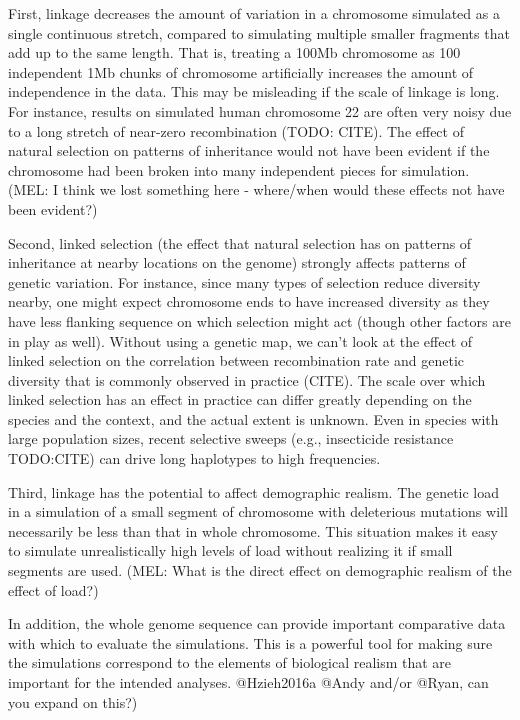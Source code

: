 \documentclass[hidelinks]{article}
\begin{document}
First, linkage decreases the amount of variation in a chromosome
simulated as a single continuous stretch, compared to simulating
multiple smaller fragments that add up to the same length. That is,
treating a 100Mb chromosome as 100 independent 1Mb chunks of chromosome
artificially increases the amount of independence in the data. This may
be misleading if the scale of linkage is long. For instance, results on
simulated human chromosome 22 are often very noisy due to a long stretch
of near-zero recombination (TODO: CITE). The effect of natural selection
on patterns of inheritance would not have been evident if the chromosome
had been broken into many independent pieces for simulation. (MEL: I
think we lost something here - where/when would these effects not have
been evident?)

Second, linked selection (the effect that natural selection has on
patterns of inheritance at nearby locations on the genome) strongly
affects patterns of genetic variation. For instance, since many types of
selection reduce diversity nearby, one might expect chromosome ends to
have increased diversity as they have less flanking sequence on which
selection might act (though other factors are in play as well). Without
using a genetic map, we can't look at the effect of linked selection on
the correlation between recombination rate and genetic diversity that is
commonly observed in practice (CITE). The scale over which linked
selection has an effect in practice can differ greatly depending on the
species and the context, and the actual extent is unknown. Even in
species with large population sizes, recent selective sweeps (e.g.,
insecticide resistance TODO:CITE) can drive long haplotypes to high
frequencies.

Third, linkage has the potential to affect demographic realism. The
genetic load in a simulation of a small segment of chromosome with
deleterious mutations will necessarily be less than that in whole
chromosome. This situation makes it easy to simulate unrealistically
high levels of load without realizing it if small segments are used.
(MEL: What is the direct effect on demographic realism of the effect of
load?)

In addition, the whole genome sequence can provide important comparative
data with which to evaluate the simulations. This is a powerful tool for
making sure the simulations correspond to the elements of biological
realism that are important for the intended analyses. @Hzieh2016a @Andy
and/or @Ryan, can you expand on this?)
\end{document}
